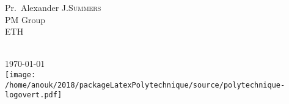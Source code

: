 \documentclass[titlepage,11pt,a4paper]{report}
\theoremstyle{plain}
\newcommand\blankpage{%
    \null
    \thispagestyle{empty}%
    \addtocounter{page}{-1}%
    \newpage}
\begin{document}
\begin{titlepage}
\begin{minipage}{0.4\textwidth}
\begin{flushright}
Pr.~Alexander J.\textsc{Summers}\\ %
PM Group\\
ETH
\end{flushright}
\end{minipage}\\[2cm]



{\large \today}\\[2cm] %


\texttt{[image: /home/anouk/2018/packageLatexPolytechnique/source/polytechnique-logovert.pdf]}\\[1cm] %
 

\vfill %

\afterpage{\blankpage}

\end{titlepage}




\tableofcontents

\afterpage{\blankpage}
\end{document}
